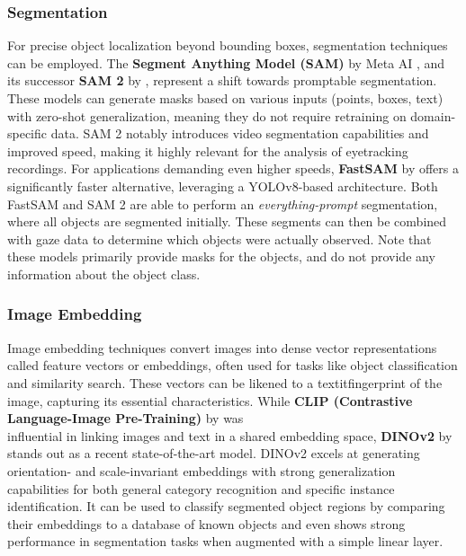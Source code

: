 \documentclass[english]{hogent-article}
\begin{document}
\subsubsection{Segmentation}

For precise object localization beyond bounding boxes, segmentation techniques can be employed.
The \textbf{Segment Anything Model (SAM)} by Meta AI \autocite{Kirillov2023}, 
and its successor \textbf{SAM 2} by \textcite{Ravi2024}, represent a shift towards promptable segmentation.
These models can generate masks based on various inputs (points, boxes, text) with zero-shot 
generalization, meaning they do not require retraining on domain-specific data.
SAM 2 notably introduces video segmentation capabilities and improved speed, making it highly relevant for the analysis of eyetracking recordings.
For applications demanding even higher speeds, \textbf{FastSAM} by \textcite{Zhao2023} offers a significantly faster alternative, leveraging a YOLOv8-based architecture.
Both FastSAM and SAM 2 are able to perform an \textit{everything-prompt} segmentation, where all objects are segmented initially.
These segments can then be combined with gaze data to determine which objects were actually observed.
Note that these models primarily provide masks for the objects, and do not provide any information about the object class.

\subsubsection{Image Embedding}

Image embedding techniques convert images into dense vector representations called feature vectors or embeddings, 
often used for tasks like object classification and similarity search.
These vectors can be likened to a textit{fingerprint} of the image, capturing its essential characteristics.
While \textbf{CLIP (Contrastive Language-Image Pre-Training)} by \textcite{Radford2021} was\\ influential in linking images and text in a shared embedding space,
\textbf{DINOv2} by \textcite{Oquab2024} stands out as a recent state-of-the-art model. 
DINOv2 excels at generating orientation- and scale-invariant embeddings with strong generalization capabilities 
for both general category recognition and specific instance identification. 
It can be used to classify segmented object regions by comparing their embeddings to a database of 
known objects and even shows strong\\ performance in segmentation tasks when augmented with a simple linear layer.
\end{document}
